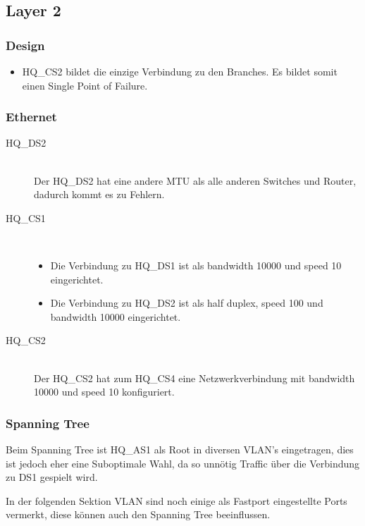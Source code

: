 \subsection{Layer 2}
\subsubsection{Design}
\begin{itemize}
	\item HQ\_CS2 bildet die einzige Verbindung zu den Branches. Es bildet somit einen Single Point of Failure.
\end{itemize}

\subsubsection{Ethernet}

\begin{description}
	\item[HQ\_DS2] \hfill \\
	 Der HQ\_DS2 hat eine andere MTU als alle anderen Switches und Router, dadurch kommt es zu Fehlern.
	\item[HQ\_CS1] \hfill \\
		\begin{itemize}
			\item Die Verbindung zu HQ\_DS1 ist als bandwidth 10000 und speed 10 eingerichtet.
			\item Die Verbindung zu HQ\_DS2 ist als half duplex, speed 100 und bandwidth 10000 eingerichtet.
		\end{itemize}
	\item[HQ\_CS2] \hfill \\
	 Der HQ\_CS2 hat zum HQ\_CS4 eine Netzwerkverbindung mit bandwidth 10000 und speed 10 konfiguriert.
\end{description}

\subsubsection{Spanning Tree}

Beim Spanning Tree ist HQ\_AS1 als Root in diversen VLAN's eingetragen, dies ist jedoch eher eine Suboptimale Wahl, da so unnötig Traffic über die Verbindung zu DS1 gespielt wird.


In der folgenden Sektion VLAN sind noch einige als Fastport eingestellte Ports vermerkt, diese können auch den Spanning Tree beeinflussen.

